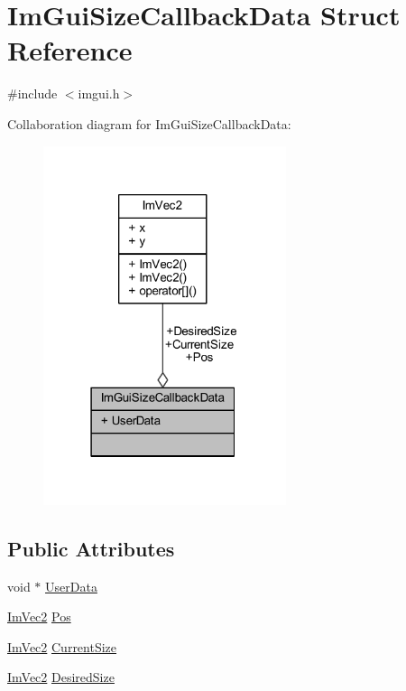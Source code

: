\hypertarget{struct_im_gui_size_callback_data}{}\section{Im\+Gui\+Size\+Callback\+Data Struct Reference}
\label{struct_im_gui_size_callback_data}


{\ttfamily \#include $<$imgui.\+h$>$}



Collaboration diagram for Im\+Gui\+Size\+Callback\+Data\+:
\nopagebreak
\begin{figure}[H]
\begin{center}
\leavevmode
\includegraphics[width=202pt]{struct_im_gui_size_callback_data__coll__graph}
\end{center}
\end{figure}
\subsection*{Public Attributes}
\begin{DoxyCompactItemize}
\item 
void $\ast$ \mbox{\hyperlink{struct_im_gui_size_callback_data_ae16a4a1b916810b2f69925c527430a39}{User\+Data}}
\item 
\mbox{\hyperlink{struct_im_vec2}{Im\+Vec2}} \mbox{\hyperlink{struct_im_gui_size_callback_data_a64fc0959664ddba84e051baaeaa9a042}{Pos}}
\item 
\mbox{\hyperlink{struct_im_vec2}{Im\+Vec2}} \mbox{\hyperlink{struct_im_gui_size_callback_data_ac26746d231819ccb5a274ff78c6fa64e}{Current\+Size}}
\item 
\mbox{\hyperlink{struct_im_vec2}{Im\+Vec2}} \mbox{\hyperlink{struct_im_gui_size_callback_data_a42be6d99a279942b4f2019a4416f65ba}{Desired\+Size}}
\end{DoxyCompactItemize}


